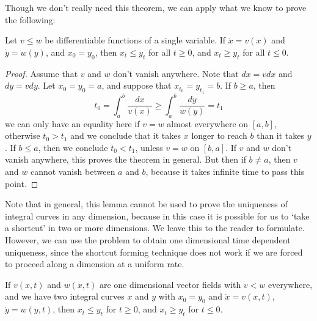 Though we don't really need this theorem, we can apply what we know to prove the following:

\begin{theorem}
    Let $v \leq w$ be differentiable functions of a single variable. If $\dot{x} = v(x)$ and $\dot{y} = w(y)$, and $x_0 = y_0$, then $x_t \leq y_t$ for all $t \geq 0$, and $x_t \geq y_t$ for all $t \leq 0$.
\end{theorem}
\begin{proof}
    Assume that $v$ and $w$ don't vanish anywhere. Note that $dx = vdx$ and $dy = vdy$. Let $x_0 = y_0 = a$, and suppose that $x_{t_0} = y_{t_1} = b$. If $b \geq a$, then
    \[ t_0 = \int_a^b \frac{dx}{v(x)} \geq \int_a^b \frac{dy}{w(y)} = t_1 \]
    we can only have an equality here if $v = w$ almost everywhere on $[a,b]$, otherwise $t_0 > t_1$ and we conclude that it takes $x$ longer to reach $b$ than it takes $y$. If $b \leq a$, then we conclude $t_0 < t_1$, unless $v = w$ on $[b,a]$. If $v$ and $w$ don't vanish anywhere, this proves the theorem in general. But then if $b \neq a$, then $v$ and $w$ cannot vanish between $a$ and $b$, because it takes infinite time to pass this point.
\end{proof}

Note that in general, this lemma cannot be used to prove the uniqueness of integral curves in any dimension, because in this case it is possible for us to `take a shortcut' in two or more dimensions. We leave this to the reader to formulate. However, we can use the problem to obtain one dimensional time dependent uniqueness, since the shortcut forming technique does not work if we are forced to proceed along a dimension at a uniform rate.

\begin{lemma}
    If $v(x,t)$ and $w(x,t)$ are one dimensional vector fields with $v < w$ everywhere, and we have two integral curves $x$ and $y$ with $x_0 = y_0$ and $\dot{x} = v(x,t)$, $\dot{y} = w(y,t)$, then $x_t \leq y_t$ for $t \geq 0$, and $x_t \geq y_t$ for $t \leq 0$.
\end{lemma}

